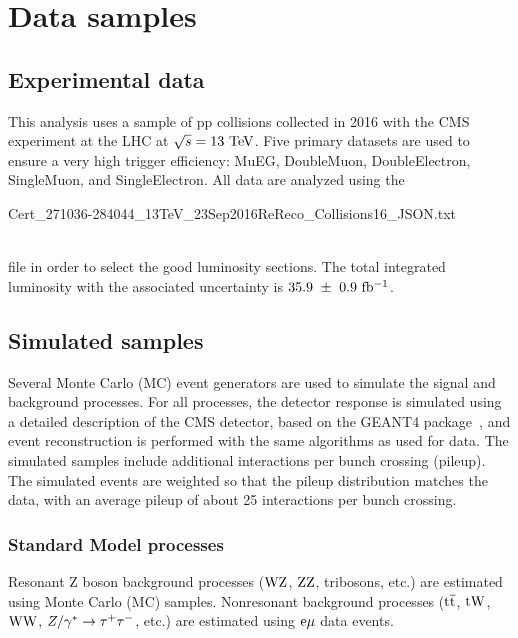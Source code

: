 \chapter{Data samples}
\section{Experimental data}
This analysis uses a sample of pp collisions collected in 2016 with the CMS 
experiment at the LHC at $\sqrt{s} = 13~\rm{TeV}$. Five primary datasets  
are used to ensure a very high trigger efficiency: MuEG, DoubleMuon, 
DoubleElectron, SingleMuon, and SingleElectron. All data are analyzed using the
\\
\centerline{\small Cert\_271036-284044\_13TeV\_23Sep2016ReReco\_Collisions16\_JSON.txt}
\\
file in order to select the good luminosity sections. 
The total integrated luminosity with the associated uncertainty is $35.9~\pm~0.9~\mathrm{fb^{-1}}$.

\section{Simulated samples}
Several Monte Carlo (MC) event generators are used to simulate the signal and
background processes. For all processes, the detector response is simulated using a detailed
description of the CMS detector, based on the \textsc{GEANT4} 
package~\cite{Agostinelli:2002hh}, and event reconstruction is performed with
the same algorithms as used for data.
The simulated samples include additional interactions per bunch crossing (pileup).
The simulated events are weighted so that the pileup distribution matches the data,
with an average pileup of about 25 interactions per bunch crossing.

\subsection{Standard Model processes}
Resonant Z boson background processes ($\mbox{W}\mbox{Z}$, $\mbox{Z}\mbox{Z}$, tribosons, etc.) are
estimated using Monte Carlo (MC) samples. Nonresonant background processes
(${\mathrm{t}\overline{\mathrm{t}}}$, $\mathrm{tW}$, $\mbox{W}\mbox{W}$, $Z/\gamma^*\to\tau^+\tau^-$, etc.) are estimated using $\mathrm{e}\mu$ data events.

